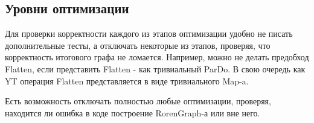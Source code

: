 \subsection{Уровни оптимизации}

Для проверки корректности каждого из этапов оптимизации удобно не писать дополнительные тесты, а отключать некоторые из этапов, проверяя, что корректность итогового графа не ломается. Например, можно не делать предобход Flatten, если представить Flatten - как тривиальный ParDo. В свою очередь как YT операция Flatten представляется в виде тривиального Map-a.

Есть возможность отключать полностью любые оптимизации, проверяя, находится ли ошибка в коде построение RorenGraph-а или вне него.
